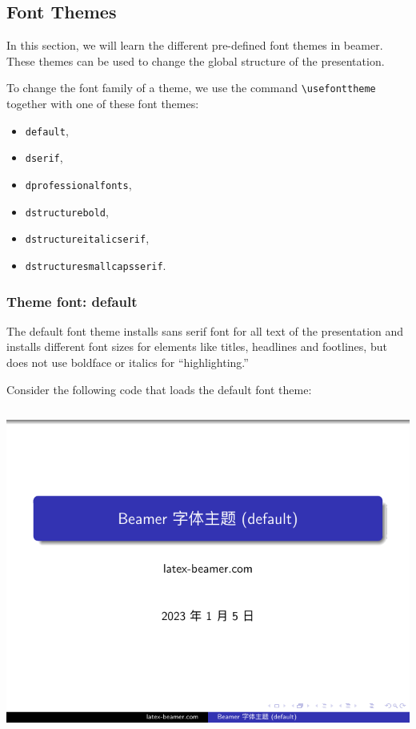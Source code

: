 \subsection{Font Themes}

In this section, we will learn the different pre-defined font themes in beamer. These themes can be used to change the global structure of the presentation.

To change the font family of a theme, we use the command \verb|\usefonttheme| together with one of these font themes:
\begin{itemize}
  \item \verb|default|,
  \item \verb|dserif|,
  \item \verb|dprofessionalfonts|,
  \item \verb|dstructurebold|,
  \item \verb|dstructureitalicserif|,
  \item \verb|dstructuresmallcapsserif|.
\end{itemize}

\subsubsection{Theme font: {\ttfamily default}}

The default font theme installs sans serif font for all text of the presentation and installs different font sizes for elements like titles, headlines and footlines, but does not use boldface or italics for “highlighting.”

Consider the following code that loads the default font theme:

\inputminted[linenos=true]{latex}{examples/beamer/beamerfont05.tex}

\includegraphics[page=1]{examples/beamer/beamerfont05.pdf}

